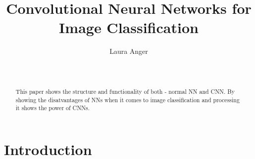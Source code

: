 \documentclass{sig-alternate-05-2015}
\begin{document}
\title{Convolutional Neural Networks for Image Classification}

\author{
\alignauthor
Laura Anger\\
       \\
       \\
}
      
\maketitle
\begin{abstract}
This paper shows the structure and functionality of both - normal NN and CNN. By showing the disatvantages of NNs when it comes to image classification and processing it shows the power of CNNs. 
\end{abstract}


\section{Introduction}
\end{document}
